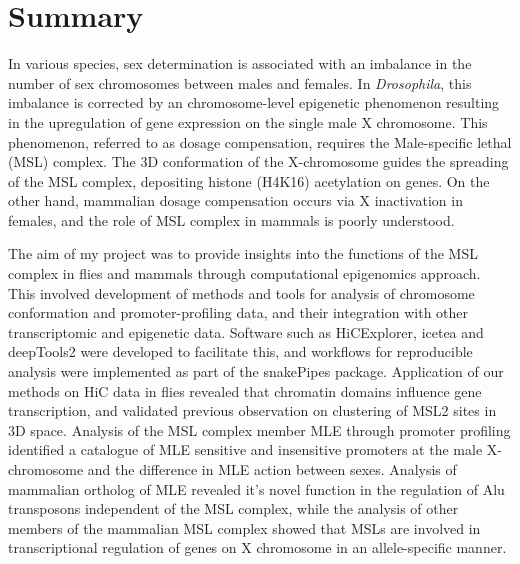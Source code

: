 \documentclass[11pt,twoside]{MPIthesis}
\theoremstyle{definition}
\theoremstyle{definition}
\theoremstyle{definition}
\theoremstyle{remark}
\begin{document}
  \listoffigures


{
  
}


%
\mainmatter %
\pagestyle{fancyplain} %


\chapter{Summary}\label{summary}

 In various species, sex determination is associated
with an imbalance in the number of sex chromosomes between males and
females. In \emph{Drosophila}, this imbalance is corrected by an
chromosome-level epigenetic phenomenon resulting in the upregulation of
gene expression on the single male X chromosome. This phenomenon,
referred to as dosage compensation, requires the Male-specific lethal
(MSL) complex. The 3D conformation of the X-chromosome guides the
spreading of the MSL complex, depositing histone (H4K16) acetylation on
genes. On the other hand, mammalian dosage compensation occurs via X
inactivation in females, and the role of MSL complex in mammals is
poorly understood.

The aim of my project was to provide insights into the functions of the
MSL complex in flies and mammals through computational epigenomics
approach. This involved development of methods and tools for analysis of
chromosome conformation and promoter-profiling data, and their
integration with other transcriptomic and epigenetic data. Software such
as HiCExplorer, icetea and deepTools2 were developed to facilitate this,
and workflows for reproducible analysis were implemented as part of the
snakePipes package. Application of our methods on HiC data in flies
revealed that chromatin domains influence gene transcription, and
validated previous observation on clustering of MSL2 sites in 3D space.
Analysis of the MSL complex member MLE through promoter profiling
identified a catalogue of MLE sensitive and insensitive promoters at the
male X-chromosome and the difference in MLE action between sexes.
Analysis of mammalian ortholog of MLE revealed it's novel function in
the regulation of Alu transposons independent of the MSL complex, while
the analysis of other members of the mammalian MSL complex showed that
MSLs are involved in transcriptional regulation of genes on X chromosome
in an allele-specific manner.
\end{document}
